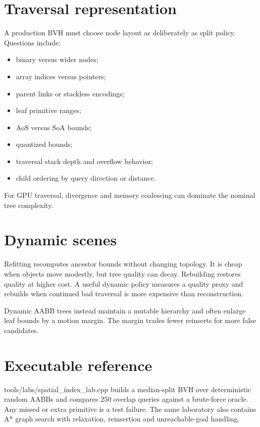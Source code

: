 \section{Traversal representation}\label{appendix-5653a7aea6bb-traversal-representation}

A production BVH must choose node layout as deliberately as split policy. Questions include:

\begin{itemize}
\tightlist
\item
  binary versus wider nodes;
\item
  array indices versus pointers;
\item
  parent links or stackless encodings;
\item
  leaf primitive ranges;
\item
  AoS versus SoA bounds;
\item
  quantized bounds;
\item
  traversal stack depth and overflow behavior;
\item
  child ordering by query direction or distance.
\end{itemize}

For GPU traversal, divergence and memory coalescing can dominate the nominal tree complexity.

\section{Dynamic scenes}\label{appendix-5653a7aea6bb-dynamic-scenes}

Refitting recomputes ancestor bounds without changing topology. It is cheap when objects move modestly, but tree quality can decay. Rebuilding restores quality at higher cost. A useful dynamic policy measures a quality proxy and rebuilds when continued bad traversal is more expensive than reconstruction.

Dynamic AABB trees instead maintain a mutable hierarchy and often enlarge leaf bounds by a motion margin. The margin trades fewer reinserts for more false candidates.

\section{Executable reference}\label{appendix-5653a7aea6bb-executable-reference}

tools/labs/spatial\_index\_lab.cpp builds a median-split BVH over deterministic random AABBs and compares 250 overlap queries against a brute-force oracle. Any missed or extra primitive is a test failure. The same laboratory also contains A* graph search with relaxation, reinsertion and unreachable-goal handling.

